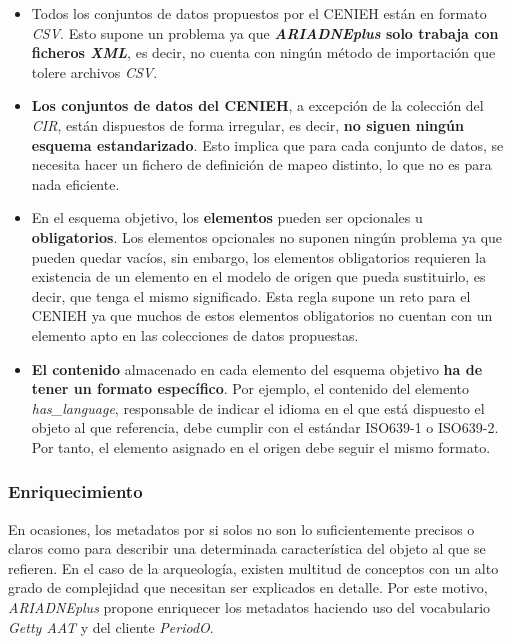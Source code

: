 \begin{itemize}
\tightlist
\item
  Todos los conjuntos de datos propuestos por el CENIEH están en formato
  \emph{CSV}. Esto supone un problema ya que \textbf{\emph{ARIADNEplus} solo trabaja
  con ficheros \emph{XML}}, es decir, no cuenta con ningún método de
  importación que tolere archivos \emph{CSV}.
\item
  \textbf{Los conjuntos de datos del CENIEH}, a excepción de la
  colección del \emph{CIR}, están dispuestos de forma irregular, es decir,
  \textbf{no siguen ningún esquema estandarizado}. Esto implica que para
  cada conjunto de datos, se necesita hacer un fichero de definición de
  mapeo distinto, lo que no es para nada eficiente.
\item
  En el esquema objetivo, los \textbf{elementos} pueden ser opcionales u
  \textbf{obligatorios}. Los elementos opcionales no suponen ningún
  problema ya que pueden quedar vacíos, sin embargo, los elementos
  obligatorios requieren la existencia de un elemento en el modelo de
  origen que pueda sustituirlo, es decir, que tenga el mismo
  significado. Esta regla supone un reto para el CENIEH ya que muchos de
  estos elementos obligatorios no cuentan con un elemento apto en las
  colecciones de datos propuestas.
\item
  \textbf{El contenido} almacenado en cada elemento del esquema objetivo
  \textbf{ha de tener un formato específico}. Por ejemplo, el contenido
  del elemento \emph{has\_language}, responsable de indicar el idioma en
  el que está dispuesto el objeto al que referencia, debe cumplir con el
  estándar ISO639-1 o ISO639-2. Por tanto, el elemento asignado en el
  origen debe seguir el mismo formato.
\end{itemize}


\subsubsection{Enriquecimiento}

En ocasiones, los metadatos por si solos no son lo suficientemente
precisos o claros como para describir una determinada característica del
objeto al que se refieren. En el caso de la arqueología, existen
multitud de conceptos con un alto grado de complejidad que necesitan ser
explicados en detalle. Por este motivo, \emph{ARIADNEplus} propone enriquecer
los metadatos haciendo uso del vocabulario \emph{Getty AAT} y del
cliente \emph{PeriodO}.


